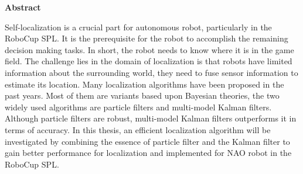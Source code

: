 \thispagestyle{empty}
\vspace*{1.0cm}

\begin{center}
    \textbf{Abstract}
\end{center}

\vspace*{0.5cm}

\noindent


Self-localization is a crucial part for autonomous robot, particularly in the RoboCup \gls{SPL}. It is the prerequisite for the robot to accomplish the remaining decision making tasks. In short, the robot needs to know where it is in the game field.  The challenge lies in the domain of localization is that robots have limited information about the surrounding world, they need to fuse sensor information to estimate its location. Many localization algorithms have been proposed in the past years. Most of them are variants based upon Bayesian theories, the two widely used algorithms are particle filters and multi-model Kalman filters. Although particle filters are robust, multi-model Kalman filters outperforms it in terms of accuracy. In this thesis, an efficient localization algorithm will be investigated by combining the essence of particle filter and the Kalman filter to gain better performance for localization and implemented for NAO robot in the RoboCup \gls{SPL}.
